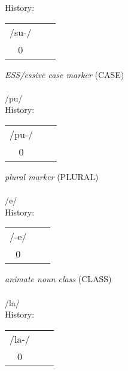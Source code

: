 \noindent History:
\begin{tabular}{ccc}
/su-/\\
0\\
\end{tabular}

\vspace{20pt}\hline



\vspace{30pt}
 \textit{ESS/essive case marker} (CASE)\\
\\
\noindent /p{\textprimstress}u/\\


\noindent History:
\begin{tabular}{ccc}
/pu-/\\
0\\
\end{tabular}

\vspace{20pt}\hline



\vspace{30pt}
 \textit{plural marker} (PLURAL)\\
\\
\noindent /{\textprimstress}e/\\


\noindent History:
\begin{tabular}{ccc}
/-e/\\
0\\
\end{tabular}

\vspace{20pt}\hline



\vspace{30pt}
 \textit{animate noun class} (CLASS)\\
\\
\noindent /l{\textprimstress}a/\\


\noindent History:
\begin{tabular}{ccc}
/la-/\\
0\\
\end{tabular}

